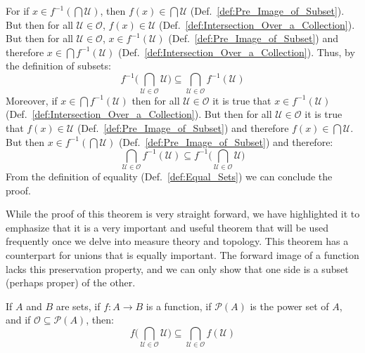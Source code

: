     \begin{bproof}
        For if $x\in{f}^{\minus{1}}(\bigcap\mathcal{U})$,
        then $f(x)\in\bigcap\mathcal{U}$ (Def.~\ref{def:Pre_Image_of_Subset}).
        But then for all $\mathcal{U}\in\mathcal{O}$, $f(x)\in\mathcal{U}$
        (Def.~\ref{def:Intersection_Over_a_Collection}). But then for all
        $\mathcal{U}\in\mathcal{O}$, $x\in{f}^{\minus{1}}(\mathcal{U})$
        (Def.~\ref{def:Pre_Image_of_Subset}) and therefore
        $x\in\bigcap{f}^{\minus{1}}(\mathcal{U})$
        (Def.~\ref{def:Intersection_Over_a_Collection}). Thus, by the definition
        of subsets:
        \begin{equation}
            f^{\minus{1}}\Big(
                \bigcap_{\mathcal{U}\in\mathcal{O}}\mathcal{U}\Big)
            \subseteq\bigcap_{\mathcal{U}\in\mathcal{O}}
                f^{\minus{1}}(\mathcal{U})
        \end{equation}
        Moreover, if $x\in\bigcap{f}^{\minus{1}}(\mathcal{U})$ then for all
        $\mathcal{U}\in\mathcal{O}$ it is true that
        $x\in{f}^{\minus{1}}(\mathcal{U})$
        (Def.~\ref{def:Intersection_Over_a_Collection}). But then for all
        $\mathcal{U}\in\mathcal{O}$ it is true that $f(x)\in\mathcal{U}$
        (Def.~\ref{def:Pre_Image_of_Subset}) and therefore
        $f(x)\in\bigcap\mathcal{U}$. But then
        $x\in{f}^{\minus{1}}(\bigcap\mathcal{U})$
        (Def.~\ref{def:Pre_Image_of_Subset}) and therefore:
        \begin{equation}
            \bigcap_{\mathcal{U}\in\mathcal{O}}f^{\minus{1}}(\mathcal{U})
            \subseteq{f}^{\minus{1}}\Big(
                \bigcap_{\mathcal{U}\in\mathcal{O}}\mathcal{U}\Big)
        \end{equation}
        From the definition of equality
        (Def.~\ref{def:Equal_Sets}) we can conclude the proof.
    \end{bproof}
    While the proof of this theorem is very straight forward, we have
    highlighted it to emphasize that it is a very important and useful theorem
    that will be used frequently once we delve into measure theory and topology.
    This theorem has a counterpart for unions that is equally important. The
    forward image of a function lacks this preservation property, and we can
    only show that one side is a subset (perhaps proper) of the other.
    \begin{theorem}
        If $A$ and $B$ are sets, if $f:A\rightarrow{B}$ is a function, if
        $\mathcal{P}(A)$ is the power set of $A$, and if
        $\mathcal{O}\subseteq\mathcal{P}(A)$, then:
        \begin{equation}
            f\Big(\bigcap_{\mathcal{U}\in\mathcal{O}}\mathcal{U}\Big)
            \subseteq\bigcap_{\mathcal{U}\in\mathcal{O}}f(\mathcal{U})
        \end{equation}
    \end{theorem}
